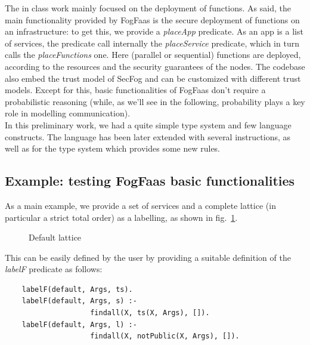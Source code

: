\documentclass[../DraftNotes.tex]{subfiles}
\begin{document}
The in class work mainly focused on the deployment of functions. As said, the main functionality provided by FogFaas is the secure deployment of functions on an infrastructure: to get this, we provide a \emph{placeApp} predicate. As an app is a list of services, the predicate call internally the \emph{placeService} predicate, which in turn calls the \emph{placeFunctions} one. Here (parallel or sequential) functions are deployed, according to the resources and the security guarantees of the nodes.
The codebase also embed the trust model of SecFog and can be customized with different trust models. Except for this, basic functionalities of FogFaas don't require a probabilistic reasoning (while, as we'll see in the following, probability plays a key role in modelling communication). \\
In this preliminary work, we had a quite simple type system and few language constructs. The language has been later extended with several instructions, as well as for the type system which provides some new rules.

\subsection{Example: testing FogFaas basic functionalities}
As a main example, we provide a set of services and a complete lattice (in particular a strict total order) as a labelling, as shown in fig.~\ref{fig:tot_order}.

\begin{figure}
	\begin{center}
	\caption{Default lattice}
  	\label{fig:tot_order}
  	\end{center}
\end{figure}

This can be easily defined by the user by providing a suitable definition of the \emph{labelF} predicate as follows:

\begin{verbatim}
	labelF(default, Args, ts).
	labelF(default, Args, s) :- 
                    findall(X, ts(X, Args), []).
	labelF(default, Args, l) :- 
                    findall(X, notPublic(X, Args), []).
\end{verbatim}
\end{document}
